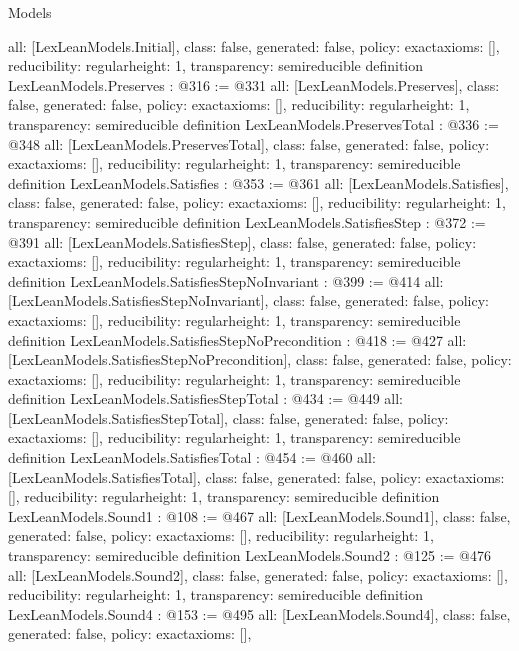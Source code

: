 \begin{lexlean}{Models}
\begin{coremodule}
{  all: [LexLeanModels.Initial],
  class: false,
  generated: false,
  policy: exact{axioms: []},
  reducibility: regular{height: 1},
  transparency: semireducible
}
definition LexLeanModels.Preserves : @316 := @331 {
  all: [LexLeanModels.Preserves],
  class: false,
  generated: false,
  policy: exact{axioms: []},
  reducibility: regular{height: 1},
  transparency: semireducible
}
definition LexLeanModels.PreservesTotal : @336 := @348 {
  all: [LexLeanModels.PreservesTotal],
  class: false,
  generated: false,
  policy: exact{axioms: []},
  reducibility: regular{height: 1},
  transparency: semireducible
}
definition LexLeanModels.Satisfies : @353 := @361 {
  all: [LexLeanModels.Satisfies],
  class: false,
  generated: false,
  policy: exact{axioms: []},
  reducibility: regular{height: 1},
  transparency: semireducible
}
definition LexLeanModels.SatisfiesStep : @372 := @391 {
  all: [LexLeanModels.SatisfiesStep],
  class: false,
  generated: false,
  policy: exact{axioms: []},
  reducibility: regular{height: 1},
  transparency: semireducible
}
definition LexLeanModels.SatisfiesStepNoInvariant : @399 := @414 {
  all: [LexLeanModels.SatisfiesStepNoInvariant],
  class: false,
  generated: false,
  policy: exact{axioms: []},
  reducibility: regular{height: 1},
  transparency: semireducible
}
definition LexLeanModels.SatisfiesStepNoPrecondition : @418 := @427 {
  all: [LexLeanModels.SatisfiesStepNoPrecondition],
  class: false,
  generated: false,
  policy: exact{axioms: []},
  reducibility: regular{height: 1},
  transparency: semireducible
}
definition LexLeanModels.SatisfiesStepTotal : @434 := @449 {
  all: [LexLeanModels.SatisfiesStepTotal],
  class: false,
  generated: false,
  policy: exact{axioms: []},
  reducibility: regular{height: 1},
  transparency: semireducible
}
definition LexLeanModels.SatisfiesTotal : @454 := @460 {
  all: [LexLeanModels.SatisfiesTotal],
  class: false,
  generated: false,
  policy: exact{axioms: []},
  reducibility: regular{height: 1},
  transparency: semireducible
}
definition LexLeanModels.Sound1 : @108 := @467 {
  all: [LexLeanModels.Sound1],
  class: false,
  generated: false,
  policy: exact{axioms: []},
  reducibility: regular{height: 1},
  transparency: semireducible
}
definition LexLeanModels.Sound2 : @125 := @476 {
  all: [LexLeanModels.Sound2],
  class: false,
  generated: false,
  policy: exact{axioms: []},
  reducibility: regular{height: 1},
  transparency: semireducible
}
definition LexLeanModels.Sound4 : @153 := @495 {
  all: [LexLeanModels.Sound4],
  class: false,
  generated: false,
  policy: exact{axioms: []},
}
\end{coremodule}
\end{lexlean}

